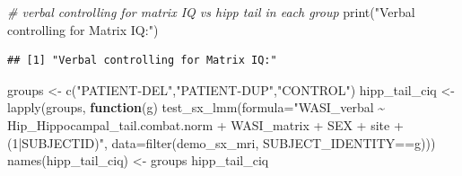\documentclass[
]{article}
\newenvironment{Shaded}{\begin{snugshade}}{\end{snugshade}}
\newcommand{\AttributeTok}[1]{\textcolor[rgb]{0.77,0.63,0.00}{#1}}
\newcommand{\CommentTok}[1]{\textcolor[rgb]{0.56,0.35,0.01}{\textit{#1}}}
\newcommand{\ControlFlowTok}[1]{\textcolor[rgb]{0.13,0.29,0.53}{\textbf{#1}}}
\newcommand{\FunctionTok}[1]{\textcolor[rgb]{0.00,0.00,0.00}{#1}}
\newcommand{\NormalTok}[1]{#1}
\newcommand{\OtherTok}[1]{\textcolor[rgb]{0.56,0.35,0.01}{#1}}
\newcommand{\SpecialCharTok}[1]{\textcolor[rgb]{0.00,0.00,0.00}{#1}}
\newcommand{\StringTok}[1]{\textcolor[rgb]{0.31,0.60,0.02}{#1}}
\begin{document}
\begin{Shaded}
\begin{Highlighting}[]
\CommentTok{\# verbal controlling for matrix IQ vs hipp tail in each group}
\FunctionTok{print}\NormalTok{(}\StringTok{"Verbal controlling for Matrix IQ:"}\NormalTok{)}
\end{Highlighting}
\end{Shaded}

\begin{verbatim}
## [1] "Verbal controlling for Matrix IQ:"
\end{verbatim}

\begin{Shaded}
\begin{Highlighting}[]
\NormalTok{groups }\OtherTok{\textless{}{-}} \FunctionTok{c}\NormalTok{(}\StringTok{"PATIENT{-}DEL"}\NormalTok{,}\StringTok{"PATIENT{-}DUP"}\NormalTok{,}\StringTok{"CONTROL"}\NormalTok{)}
\NormalTok{hipp\_tail\_ciq }\OtherTok{\textless{}{-}} \FunctionTok{lapply}\NormalTok{(groups, }\ControlFlowTok{function}\NormalTok{(g) }\FunctionTok{test\_sx\_lmm}\NormalTok{(}\AttributeTok{formula=}\StringTok{"WASI\_verbal \textasciitilde{} Hip\_Hippocampal\_tail.combat.norm + WASI\_matrix + SEX + site  + (1|SUBJECTID)"}\NormalTok{, }\AttributeTok{data=}\FunctionTok{filter}\NormalTok{(demo\_sx\_mri, SUBJECT\_IDENTITY}\SpecialCharTok{==}\NormalTok{g)))}
\FunctionTok{names}\NormalTok{(hipp\_tail\_ciq) }\OtherTok{\textless{}{-}}\NormalTok{ groups}
\NormalTok{hipp\_tail\_ciq}
\end{Highlighting}
\end{Shaded}
\end{document}
